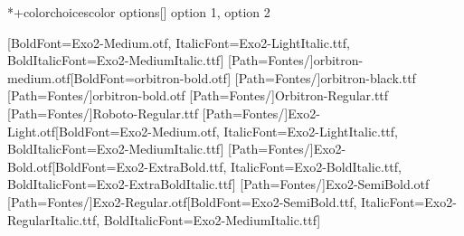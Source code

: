 
+{colorchoices}{color options}[\val{}]
    {option 1, option 2}{%
            \ifcase{}\relax
            \or
            \fi
        }{%
        }


%
%
%



\ProvidesPackage{\filename}


\RequirePackage{ifthen}

\def\fonts{Fontes/}

\RequirePackage{fontspec}
\setmainfont[Path=\fonts]{Exo2-Light.otf}[BoldFont=Exo2-Medium.otf, ItalicFont=Exo2-LightItalic.ttf, BoldItalicFont=Exo2-MediumItalic.ttf]
\newfontfamily{\titlefont}[Path=\fonts]{orbitron-medium.otf}[BoldFont=orbitron-bold.otf]
\newfontfamily{\secondtitlefont}[Path=\fonts]{orbitron-black.ttf}
\newfontfamily{\thirdtitlefont}[Path=\fonts]{orbitron-bold.otf}
\newfontfamily{\pagetitlefont}[Path=\fonts]{Orbitron-Regular.ttf}
\newfontfamily{\boxfont}[Path=\fonts]{Roboto-Regular.ttf}
\newfontfamily{\enumeratefont}[Path=\fonts]{Exo2-Light.otf}[BoldFont=Exo2-Medium.otf, ItalicFont=Exo2-LightItalic.ttf, BoldItalicFont=Exo2-MediumItalic.ttf]
\newfontfamily{\boxtitlefont}[Path=\fonts]{Exo2-Bold.otf}[BoldFont=Exo2-ExtraBold.ttf, ItalicFont=Exo2-BoldItalic.ttf, BoldItalicFont=Exo2-ExtraBoldItalic.ttf] %
\newfontfamily{\extitlefont}[Path=\fonts]{Exo2-SemiBold.otf} %
\newfontfamily{\boxexample}[Path=\fonts]{Exo2-Regular.otf}[BoldFont=Exo2-SemiBold.ttf, ItalicFont=Exo2-RegularItalic.ttf, BoldItalicFont=Exo2-MediumItalic.ttf] %

